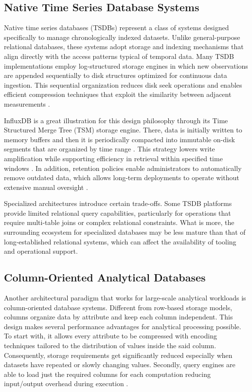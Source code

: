\subsection{Native Time Series Database Systems}
Native time series databases (TSDBs) represent a class of systems designed specifically to manage chronologically indexed datasets. Unlike general-purpose relational databases, these systems adopt storage and indexing mechanisms that align directly with the access patterns typical of temporal data. Many TSDB implementations employ log-structured storage engines in which new observations are appended sequentially to disk structures optimized for continuous data ingestion. This sequential organization reduces disk seek operations and enables efficient compression techniques that exploit the similarity between adjacent measurements \cite{pelkonen2015}.

InfluxDB is a great illustration for this design philosophy through its Time Structured Merge Tree (TSM) storage engine. There, data is initially written to memory buffers and then it is periodically compacted into immutable on-disk segments that are organized by time range \cite{influxdb_docs}. This strategy lowers write amplification while supporting efficiency in retrieval within specified time windows \cite{influxdb_docs}. In addition, retention policies enable administrators to automatically remove outdated data, which allows long-term deployments to operate without extensive manual oversight \cite{Nasar_Kausar_2019}.

Specialized architectures introduce certain trade-offs. Some TSDB platforms provide limited relational query capabilities, particularly for operations that require multi-table joins or complex relational constraints. What is more, the surrounding ecosystem for specialized databases may be less mature than that of long-established relational systems, which can affect the availability of tooling and operational support.


\subsection{Column-Oriented Analytical Databases}
Another architectural paradigm that works for large-scale analytical workloads is column-oriented database systems. Different from row-based storage models, columns organize data by attribute and keep each column independent. This design makes several performance advantages for analytical processing possible. To start with, it allows every attribute to be compressed with encoding techniques tailored to the distribution of values inside the said column. Consequently, storage requirements get significantly reduced especially when datasets have repeated or slowly changing values. Secondly, query engines are able to load just the required columns for each computation reducing input/output overhead during execution \cite{abadi2008columnstores}.


